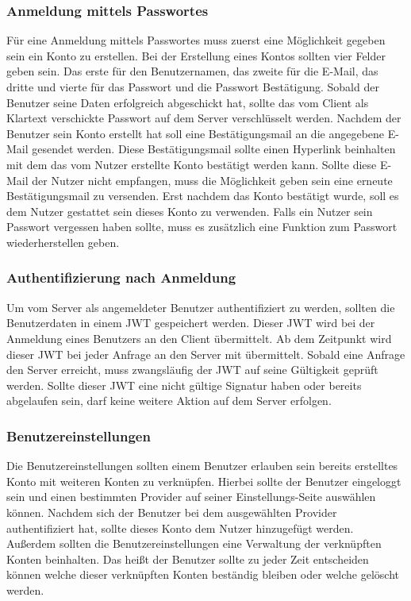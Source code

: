 \documentclass[paper=a4,fontsize=12pt,parskip=half]{scrartcl}
\begin{document}
	\subsubsection{Anmeldung mittels Passwortes}
	Für eine Anmeldung mittels Passwortes muss zuerst eine Möglichkeit gegeben sein ein Konto zu erstellen. Bei der Erstellung eines Kontos sollten vier Felder geben sein. Das erste für den Benutzernamen, das zweite für die E-Mail, das dritte und vierte für das Passwort und die Passwort Bestätigung. Sobald der Benutzer seine Daten erfolgreich abgeschickt hat, sollte das vom Client als Klartext verschickte Passwort auf dem Server verschlüsselt werden. Nachdem der Benutzer sein Konto erstellt hat soll eine Bestätigungsmail an die angegebene E-Mail gesendet werden. Diese Bestätigungsmail sollte einen Hyperlink beinhalten mit dem das vom Nutzer erstellte Konto bestätigt werden kann. Sollte diese E-Mail der Nutzer nicht empfangen, muss die Möglichkeit geben sein eine erneute Bestätigungsmail zu versenden. Erst nachdem das Konto bestätigt wurde, soll es dem Nutzer gestattet sein dieses Konto zu verwenden. Falls ein Nutzer sein Passwort vergessen haben sollte, muss es zusätzlich eine Funktion zum Passwort wiederherstellen geben.

	\subsubsection{Authentifizierung nach Anmeldung}
	Um vom Server als angemeldeter Benutzer authentifiziert zu werden, sollten die Benutzerdaten in einem \gls{JWT} gespeichert werden. Dieser \gls{JWT} wird bei der Anmeldung eines Benutzers an den Client übermittelt. Ab dem Zeitpunkt wird dieser \gls{JWT} bei jeder Anfrage an den Server mit übermittelt. Sobald eine Anfrage den Server erreicht, muss zwangsläufig der \gls{JWT} auf seine Gültigkeit geprüft werden. Sollte dieser \gls{JWT} eine nicht gültige Signatur haben oder bereits abgelaufen sein, darf keine weitere Aktion auf dem Server erfolgen.

	\subsubsection{Benutzereinstellungen}
	Die Benutzereinstellungen sollten einem Benutzer erlauben sein bereits erstelltes Konto mit weiteren Konten zu verknüpfen. Hierbei sollte der Benutzer eingeloggt sein und einen bestimmten Provider auf seiner Einstellungs-Seite auswählen können. Nachdem sich der Benutzer bei dem ausgewählten Provider authentifiziert hat, sollte dieses Konto dem Nutzer hinzugefügt werden.  Außerdem sollten die Benutzereinstellungen eine Verwaltung der verknüpften Konten beinhalten. Das heißt der Benutzer sollte zu jeder Zeit entscheiden können welche dieser verknüpften Konten beständig bleiben oder welche gelöscht werden.
\end{document}
